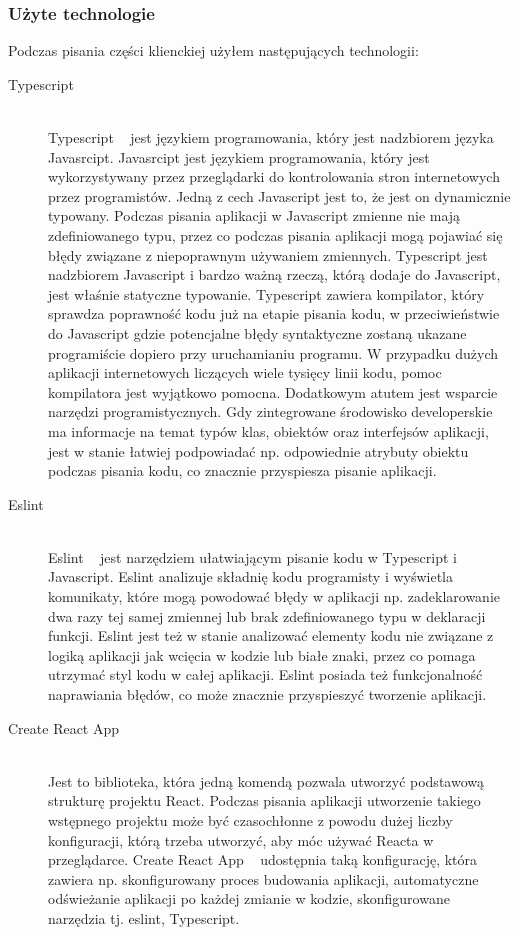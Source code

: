\subsubsection{Użyte technologie}
Podczas pisania części klienckiej użyłem następujących technologii:
\begin{description}
  \item[Typescript] \hfill \\ Typescript ~\cite{ref_ts_doc} jest językiem programowania, który jest nadzbiorem języka Javasrcipt. Javasrcipt jest językiem programowania, który jest wykorzystywany przez przeglądarki do kontrolowania stron internetowych przez programistów. Jedną z cech Javascript jest to, że jest on dynamicznie typowany. Podczas pisania aplikacji w Javascript zmienne nie mają zdefiniowanego typu, przez co podczas pisania aplikacji mogą pojawiać się błędy związane z niepoprawnym używaniem zmiennych. Typescript jest nadzbiorem Javascript i bardzo ważną rzeczą, którą dodaje do Javascript, jest właśnie statyczne typowanie. Typescript zawiera kompilator, który sprawdza poprawność kodu już na etapie pisania kodu, w przeciwieństwie do Javascript gdzie potencjalne błędy syntaktyczne zostaną ukazane programiście dopiero przy uruchamianiu programu. W przypadku dużych aplikacji internetowych liczących wiele tysięcy linii kodu, pomoc kompilatora jest wyjątkowo pomocna. Dodatkowym atutem jest wsparcie narzędzi programistycznych. Gdy zintegrowane środowisko developerskie ma informacje na temat typów klas, obiektów oraz interfejsów aplikacji, jest w stanie łatwiej podpowiadać np. odpowiednie atrybuty obiektu podczas pisania kodu, co znacznie przyspiesza pisanie aplikacji.
  \item[Eslint] \hfill \\ Eslint ~\cite{ref_eslint_doc} jest narzędziem ułatwiającym pisanie kodu w Typescript i Javascript. Eslint analizuje składnię kodu programisty i wyświetla komunikaty, które mogą powodować błędy w aplikacji np. zadeklarowanie dwa razy tej samej zmiennej lub brak zdefiniowanego typu w deklaracji funkcji. Eslint jest też w stanie analizować elementy kodu nie związane z logiką aplikacji jak wcięcia w kodzie lub białe znaki, przez co pomaga utrzymać styl kodu w całej aplikacji. Eslint posiada też funkcjonalność naprawiania błędów, co może znacznie przyspieszyć tworzenie aplikacji.
  \item[Create React App] \hfill \\ Jest to biblioteka, która jedną komendą pozwala utworzyć podstawową strukturę projektu React. Podczas pisania aplikacji utworzenie takiego wstępnego projektu może być czasochłonne z powodu dużej liczby konfiguracji, którą trzeba utworzyć, aby móc używać Reacta w przeglądarce. Create React App ~\cite{ref_cra_doc} udostępnia taką konfigurację, która zawiera np. skonfigurowany proces budowania aplikacji, automatyczne odświeżanie aplikacji po każdej zmianie w kodzie, skonfigurowane narzędzia tj. eslint, Typescript.

\end{description}

